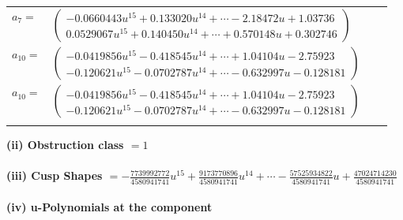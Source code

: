 \documentclass[1p]{elsarticle_modified}
\theoremstyle{definition}
\begin{document}
\begin{tabular}{m{7pt} m{180pt} m{7pt} m{180pt} }
\flushright $a_{7}=$&$\begin{pmatrix}-0.0660443 u^{15}+0.133020 u^{14}+\cdots-2.18472 u+1.03736\\0.0529067 u^{15}+0.140450 u^{14}+\cdots+0.570148 u+0.302746\end{pmatrix}$ \\
\flushright $a_{10}=$&$\begin{pmatrix}-0.0419856 u^{15}-0.418545 u^{14}+\cdots+1.04104 u-2.75923\\-0.120621 u^{15}-0.0702787 u^{14}+\cdots-0.632997 u-0.128181\end{pmatrix}$\\ \flushright $a_{10}=$&$\begin{pmatrix}-0.0419856 u^{15}-0.418545 u^{14}+\cdots+1.04104 u-2.75923\\-0.120621 u^{15}-0.0702787 u^{14}+\cdots-0.632997 u-0.128181\end{pmatrix}$\\&\end{tabular}
\flushleft \textbf{(ii) Obstruction class $= 1$}\\~\\
\flushleft \textbf{(iii) Cusp Shapes $= -\frac{7739992772}{4580941741} u^{15}+\frac{9173770896}{4580941741} u^{14}+\cdots-\frac{57525934822}{4580941741} u+\frac{47024714230}{4580941741}$}\\~\\
\newpage\renewcommand{\arraystretch}{1}
\flushleft \textbf{(iv) u-Polynomials at the component}\newline \\
\end{document}
